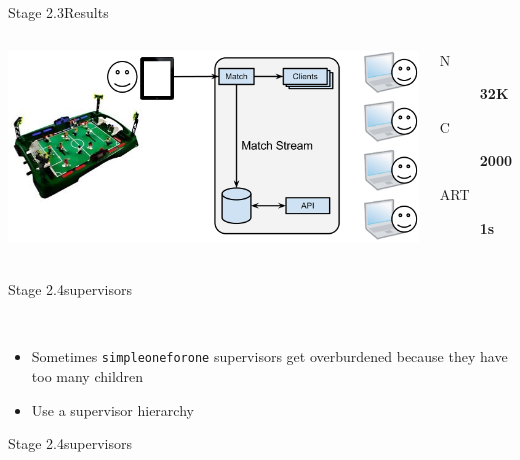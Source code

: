 \documentclass[utf8]{beamer}
\begin{document}
\begin{frame}{Stage 2.3}{Results}
	\begin{columns}
			\includegraphics[top=-1,width=\textwidth]{img/results-1.png}
			\begin{description}
				\item[N] \textbf{\Large 32K}
				\item[C] \textbf{\Large 2000}
				\item[ART] \textbf{\Large 1s}
			\end{description}
	\end{columns}
\end{frame}
\begin{frame}{Stage 2.4}{supervisors}
	\begin{description}
		\item<+->[Simple One for Ones]\ \\
			\begin{itemize}
				\item Sometimes \texttt{simple\textunderscore one\textunderscore for\textunderscore one} supervisors get \alert{overburdened} because they have too many children
				\item Use a supervisor hierarchy
			\end{itemize}
	\end{description}
\end{frame}
\begin{frame}{Stage 2.4}{supervisors}
\end{frame}
\end{document}
